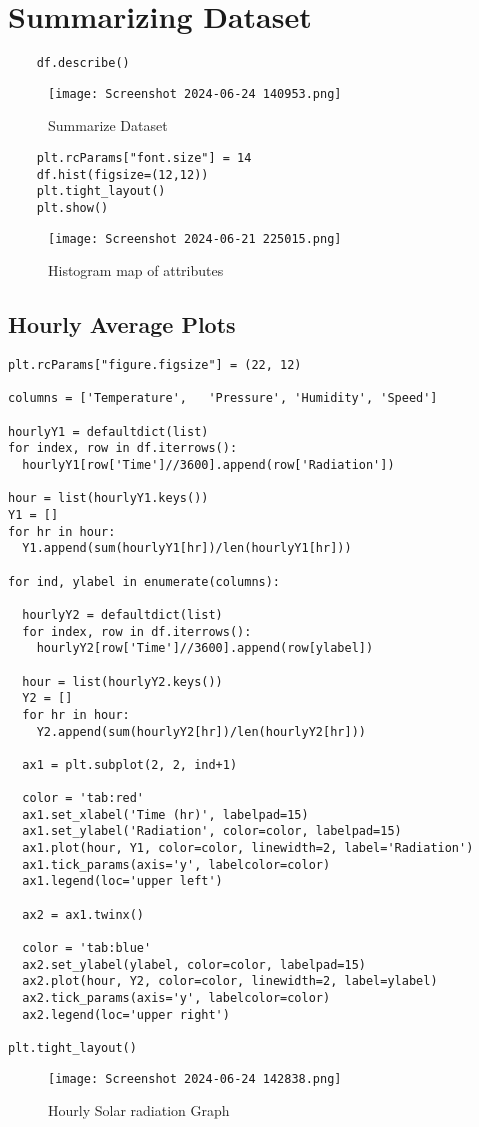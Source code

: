 \documentclass[12pt,a4paper]{report}
\begin{document}
\section{Summarizing Dataset}
\begin{lstlisting}
    df.describe()
\end{lstlisting}
\begin{figure} [!ht]
    \centering
    \texttt{[image: Screenshot 2024-06-24 140953.png]}
    \caption{Summarize Dataset}
    \label{fig:enter-label}
\end{figure}
\begin{lstlisting}
    plt.rcParams["font.size"] = 14
    df.hist(figsize=(12,12))
    plt.tight_layout()
    plt.show()
\end{lstlisting}
\begin{figure} [!ht]
    \centering
    \texttt{[image: Screenshot 2024-06-21 225015.png]}
    \caption{Histogram map of attributes}
    \label{fig:enter-label}
\end{figure}
\subsection{Hourly Average Plots}
\begin{lstlisting}
plt.rcParams["figure.figsize"] = (22, 12)

columns = ['Temperature',	'Pressure',	'Humidity',	'Speed']

hourlyY1 = defaultdict(list)
for index, row in df.iterrows():
  hourlyY1[row['Time']//3600].append(row['Radiation'])

hour = list(hourlyY1.keys())
Y1 = []
for hr in hour:
  Y1.append(sum(hourlyY1[hr])/len(hourlyY1[hr]))

for ind, ylabel in enumerate(columns):

  hourlyY2 = defaultdict(list)
  for index, row in df.iterrows():
    hourlyY2[row['Time']//3600].append(row[ylabel])

  hour = list(hourlyY2.keys())
  Y2 = []
  for hr in hour:
    Y2.append(sum(hourlyY2[hr])/len(hourlyY2[hr]))

  ax1 = plt.subplot(2, 2, ind+1)

  color = 'tab:red'
  ax1.set_xlabel('Time (hr)', labelpad=15)
  ax1.set_ylabel('Radiation', color=color, labelpad=15)
  ax1.plot(hour, Y1, color=color, linewidth=2, label='Radiation')
  ax1.tick_params(axis='y', labelcolor=color)
  ax1.legend(loc='upper left')

  ax2 = ax1.twinx()

  color = 'tab:blue'
  ax2.set_ylabel(ylabel, color=color, labelpad=15)
  ax2.plot(hour, Y2, color=color, linewidth=2, label=ylabel)
  ax2.tick_params(axis='y', labelcolor=color)
  ax2.legend(loc='upper right')

plt.tight_layout()
\end{lstlisting}\begin{figure} [!ht]
    \centering
    \texttt{[image: Screenshot 2024-06-24 142838.png]}
    \caption{Hourly Solar radiation Graph}
    \label{fig:enter-label}
\end{figure}
\end{document}
